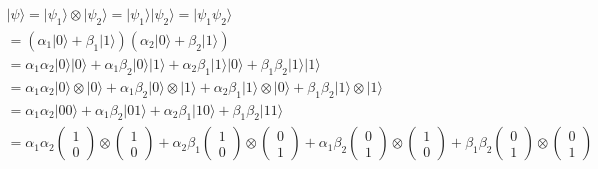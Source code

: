 \documentclass{article}
\begin{document}
\begin{multline}
\lvert \psi \rangle = \lvert \psi _ 1 \rangle \otimes \lvert \psi _ 2 \rangle 
= \lvert \psi _ 1 \rangle \lvert \psi _ 2 \rangle
= \lvert \psi _ 1 \psi _ 2 \rangle
\\
= (\alpha_1 \lvert 0 \rangle      + \beta_1 \lvert 1 \rangle)(\alpha_2 \lvert 0 \rangle      + \beta_2 \lvert 1 \rangle)
\\
= \alpha_1 \alpha_2 \lvert 0 \rangle \lvert 0 \rangle         
+ \alpha_1 \beta_2 \lvert 0 \rangle \lvert 1 \rangle      
+ \alpha_2 \beta_1 \lvert 1 \rangle\lvert 0 \rangle        
+ \beta_1 \beta_2 \lvert 1 \rangle\lvert 1 \rangle
\\
= \alpha_1 \alpha_2 \lvert 0 \rangle \otimes \lvert 0 \rangle         
+ \alpha_1 \beta_2 \lvert 0 \rangle  \otimes \lvert 1 \rangle      
+ \alpha_2 \beta_1 \lvert 1 \rangle  \otimes \lvert 0 \rangle        
+ \beta_1 \beta_2 \lvert 1 \rangle  \otimes \lvert 1 \rangle
\\
= \alpha_1 \alpha_2 \lvert 0  0 \rangle 
+ \alpha_1 \beta_2 \lvert 0 1 \rangle 
+ \alpha_2 \beta_1 \lvert 1  0 \rangle 
+ \beta_1 \beta_2 \lvert 1 1 \rangle
\\
= \alpha_1 \alpha_2        \begin{pmatrix}1\\0\end{pmatrix} \otimes \begin{pmatrix}1\\0\end{pmatrix} 
+ \alpha_2 \beta_1           \begin{pmatrix}1\\0\end{pmatrix} \otimes \begin{pmatrix}0\\1\end{pmatrix} 
+ \alpha_1 \beta_2            \begin{pmatrix}0\\1\end{pmatrix} \otimes \begin{pmatrix}1\\0\end{pmatrix} 
+ \beta_1 \beta_2               \begin{pmatrix}0\\1\end{pmatrix} \otimes \begin{pmatrix}0\\1\end{pmatrix} 
\\

\end{multline}
\end{document}
